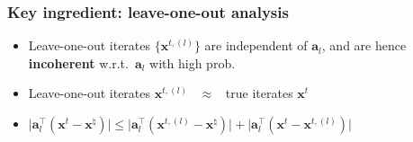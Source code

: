 \documentclass[compress,
mathserif,wide,%
]{beamer}
\newcommand{\yuxinRegFigs}{figure}
\begin{document}
\begin{frame}
	\frametitle{Key ingredient: leave-one-out analysis}

\begin{figure}
\centering
\end{figure}
\begin{itemize}
	\itemsep0.5em
	\item Leave-one-out iterates $\{\bm{x}^{t,(l)}\}$ are independent of $\bm{a}_l$, and are hence {\bf incoherent} w.r.t.~$\bm{a}_l$ with high prob.
	\item<2-> Leave-one-out iterates $\bm{x}^{t,(l)}$ ~$\approx$~ true iterates $\bm{x}^{t}$ 
	\item<3->{
$
\big| \bm{a}_l^{\top} (\bm{x}^{t}- \bm{x}^{\natural} ) \big | \leq \big| \bm{a}_l^{\top} (\bm{x}^{t,(l)}- \bm{x}^{\natural} ) \big | + \big| \bm{a}_l^{\top} (\bm{x}^{t}- \bm{x}^{t,(l)} ) \big |
$
}
\end{itemize}



\end{frame}
\end{document}
